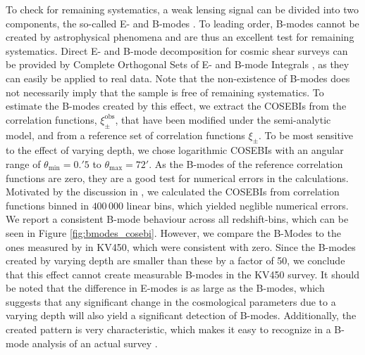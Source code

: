 \documentclass{aa}
\renewcommand{\rm}{\mathrm}
\begin{document}
To check for remaining systematics, a weak lensing signal can be divided into two components, the so-called E- and B-modes \citep{2002ApJ...568...20C,2002A&A...389..729S}. To leading order, B-modes cannot be created by astrophysical phenomena and are thus an excellent test for remaining systematics. Direct E- and B-mode decomposition for cosmic shear surveys can be provided by Complete Orthogonal Sets of E- and B-mode Integrals \citep[COSEBIs,][hereafter S10]{2010A&A...520A.116S}, as they can easily be applied to real data. Note that the non-existence of B-modes does not necessarily imply that the sample is free of remaining systematics.
To estimate the B-modes created by this effect, we extract the COSEBIs
 from the correlation functions, $\xi_\pm^{\rm{obs}}$, that have been modified under the semi-analytic model, and from a reference set of correlation functions $\xi_\pm$. To be most sensitive to the effect of varying depth, we chose logarithmic COSEBIs with an angular range of $\theta_{\rm{min}}=0.\!'5$ to $\theta_{\rm{max}}=72'$. As the B-modes of the reference correlation functions are zero, they are a good test for numerical errors in the calculations. Motivated by the discussion in \citet{2017MNRAS.464.1676A}, we calculated the COSEBIs from correlation functions binned in $400\,000$ linear bins, which yielded neglible numerical errors. We report a consistent B-mode behaviour across all redshift-bins, which can be seen in Figure \ref{fig:bmodes_cosebi}. However, we compare the B-Modes to the ones measured by \citet{asgari/etal:2019} in KV450, which were consistent with zero. Since the B-modes created by varying depth are smaller than these by a factor of 50, we conclude that this effect cannot create measurable B-modes in the KV450 survey. It should be noted that the difference in E-modes is as large as the B-modes, which suggests that any significant change in the cosmological parameters due to a varying depth will also yield a significant detection of B-modes. Additionally, the created pattern is very characteristic, which makes it easy to recognize in a B-mode analysis of an actual survey \citep[see][]{2018arXiv181002353A}.
\end{document}

